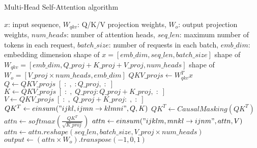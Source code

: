 \renewcommand{\algorithmicrequire}{\textbf{Require：}\unskip}
\renewcommand{\algorithmicensure}{\textbf{Input：}\unskip}
\renewcommand{\algorithmiccomment}[1]{\hfill$\vartriangleright${\color{blue}{\textit{#1}}}}

\begin{algorithm}[H]
  \caption{Multi-Head Self-Attention algorithm}
  \label{alg:attn}
  \small
  \begin{algorithmic}[1]
    \Ensure $x$: input sequence, $W_{qkv}$: Q/K/V projection weights, $W_{o}$: output projection weights, $num\_heads$: number of attention heads,  $seq\_len$: maximum number of tokens in each request, $batch\_size$: number of requests in each batch, $emb\_dim$: embedding dimension
    \Require shape of $x = [emb\_dim, seq\_len, batch\_size]$
    \Require shape of $W_{qkv} = [emb\_dim, Q\_proj + K\_proj + V\_proj, num\_heads]$
    \Require shape of $W_{o} = [V\_proj \times num\_heads, emb\_dim]$
    \State $QKV\_projs \leftarrow W_{qkv}^Tx$
    \State $Q \leftarrow QKV\_projs \; [\; : \;, \; : Q\_proj, \; : \;]$  
    \State $K \leftarrow QKV\_projs \; [\; : \;, \; Q\_proj : Q\_proj + K\_proj, \; : \;]$ 
    \State $V \leftarrow QKV\_projs \; [\; : \;, \; Q\_proj + K\_proj : \;, \; : \;]$ 
    \State $QK^T \leftarrow einsum("ijkl,ijmn\rightarrow klmni",Q,K)$ 
    \State $QK^T \leftarrow CausalMasking(QK^T)$
    \State $attn \leftarrow softmax(\frac{QK^T}{\sqrt{K\_proj}})$
    \State $attn \leftarrow einsum("ijklm,mnkl \rightarrow ijnm", attn, V)$
    \State $attn \leftarrow attn.reshape(seq\_len, batch\_size, V\_proj \times num\_heads)$
    \State $output \leftarrow (attn \times W_{o}).transpose(-1,0,1)$
  \end{algorithmic}
\end{algorithm}

